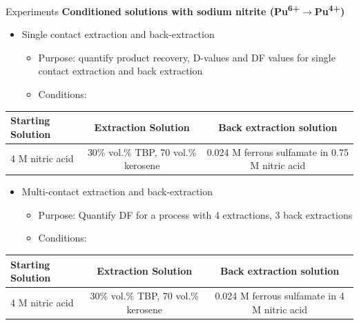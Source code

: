 \documentclass{beamer}
\newcommand{\tss}{\textsuperscript}
\begin{document}
\begin{frame}{Experiments}
  \textbf{Conditioned solutions with sodium nitrite (Pu\tss{6+}$\rightarrow$Pu\tss{4+})}
  \begin{itemize}
  \item{Single contact extraction and back-extraction}
    \begin{itemize}
    \item{Purpose: quantify product recovery, D-values and DF values
      for single contact extraction and back extraction}
    \item{Conditions:}
    \end{itemize}
  \end{itemize}
  \begin{center}
    \vskip -0.2cm
    {\fontsize{2.5}{4}\selectfont
      \begin{tabular}{l  c  c}\toprule
        Starting Solution  & Extraction Solution
        & Back extraction solution \\ \midrule \vspace{0.1cm}
        4 M nitric acid & 30\% vol.\% TBP, 70 vol.\% kerosene & 0.024 M ferrous sulfamate in 0.75 M nitric acid \\ \bottomrule
      \end{tabular}
      }
  \end{center}
  \begin{itemize}
  \item{Multi-contact extraction and back-extraction}
    \begin{itemize}
    \item{Purpose: Quantify DF for a process with 4 extractions,
      3 back extractions}
    \item{Conditions:}
    \end{itemize}
  \end{itemize}
    \begin{center}
    \vskip -0.2cm
    {\fontsize{2.5}{4}\selectfont
      \begin{tabular}{l  c  c}\toprule
        Starting Solution  & Extraction Solution
        & Back extraction solution \\ \midrule \vspace{0.1cm}
        4 M nitric acid & 30\% vol.\% TBP, 70 vol.\% kerosene & 0.024 M ferrous sulfamate in 4 M nitric acid \\ \bottomrule
      \end{tabular}
      }
  \end{center}
\end{frame}
\end{document}
